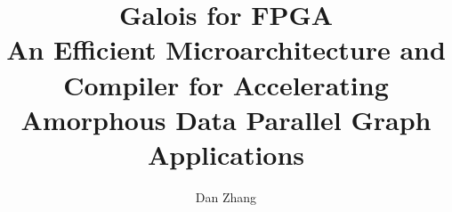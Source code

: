 \documentclass[10pt]{ClemsonProposal}
\title{Galois for FPGA\\An Efficient Microarchitecture and Compiler for Accelerating Amorphous Data Parallel Graph Applications}
\author{Dan Zhang}
\begin{document}
    \begin{frontmatter}
        \maketitle
		\tableofcontents
        \newpage

        
	\end{frontmatter}



    \doublespacing     %
    \pagestyle{fancy}  %

    
    
    
    
    



\end{document}
